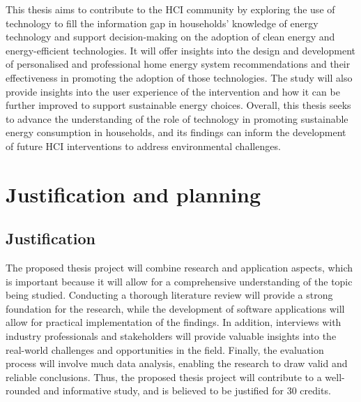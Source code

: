 

This thesis aims to contribute to the HCI community by exploring the use of technology to fill the information gap in households' knowledge of energy technology and support decision-making on the adoption of clean energy and energy-efficient technologies. 
It will offer insights into the design and development of personalised and professional home energy system recommendations and their effectiveness in promoting the adoption of those technologies. 
The study will also provide insights into the user experience of the intervention and how it can be further improved to support sustainable energy choices. 
Overall, this thesis seeks to advance the understanding of the role of technology in promoting sustainable energy consumption in households, and its findings can inform the development of future HCI interventions to address environmental challenges. 


\section{Justification and planning} 

\subsection{Justification}

The proposed thesis project will combine research and application aspects, 
which is important because it will allow for a comprehensive understanding of the topic being studied. 
Conducting a thorough literature review will provide a strong foundation for the research, 
while the development of software applications will allow for practical implementation of the findings. 
In addition, interviews with industry professionals and stakeholders will provide valuable insights into the real-world challenges and opportunities in the field. 
Finally, the evaluation process will involve much data analysis, enabling the research to draw valid and reliable conclusions. 
Thus, the proposed thesis project will contribute to a well-rounded and informative study, and is believed to be justified for 30 credits.



